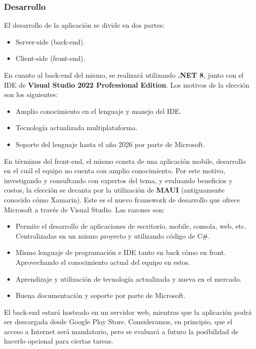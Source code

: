 \documentclass[a4paper,12pt]{article}
\begin{document}
    \subsubsection{Desarrollo}
    \par El desarrollo de la aplicación se divide en dos partes:
    \begin{itemize}
        \item Server-side (back-end).
        \item Client-side (front-end).
    \end{itemize}
    \par En cuanto al back-end del mismo, se realizará utilizando \textbf{.NET 8}, junto con el IDE de \textbf{Visual Studio 2022 Professional Edition}. Los motivos de la elección son los siguientes:
    \begin{itemize}
        \item Amplio conocimiento en el lenguaje y manejo del IDE.
        \item Tecnología actualizada multiplataforma.
        \item Soporte del lenguaje hasta el año 2026 por parte de Microsoft.
    \end{itemize}
    \par En términos del front-end, el mismo consta de una aplicación mobile, desarrollo en el cuál el equipo no cuenta con amplio conocimiento. Por este motivo, investigando y consultando con expertos del tema, y evaluando beneficios y costos, la elección se decanta por la utilización de \textbf{MAUI} (antiguamente conocido cómo Xamarin). Este es el nuevo framework de desarrollo que ofrece Microsoft a través de Visual Studio. Las razones son:
    \begin{itemize}
        \item Permite el desarrollo de aplicaciones de escritorio, mobile, consola, web, etc. Centralizadas en un mismo proyecto y utilizando código de C\#.
        \item Mismo lenguaje de programación e IDE tanto en back cómo en front. Aprovechando el conocimiento actual del equipo en estos.
        \item Aprendizaje y utilización de tecnología actualizada y nueva en el mercado.
        \item Buena documentación y soporte por parte de Microsoft.
    \end{itemize}
    \par El back-end estará hosteado en un servidor web, mientras que la aplicación podrá ser descargada desde Google Play Store. Consideramos, en principio, que el acceso a Internet será mandatorio, pero se evaluará a futuro la posibilidad de hacerlo opcional para ciertas tareas.
\end{document}
